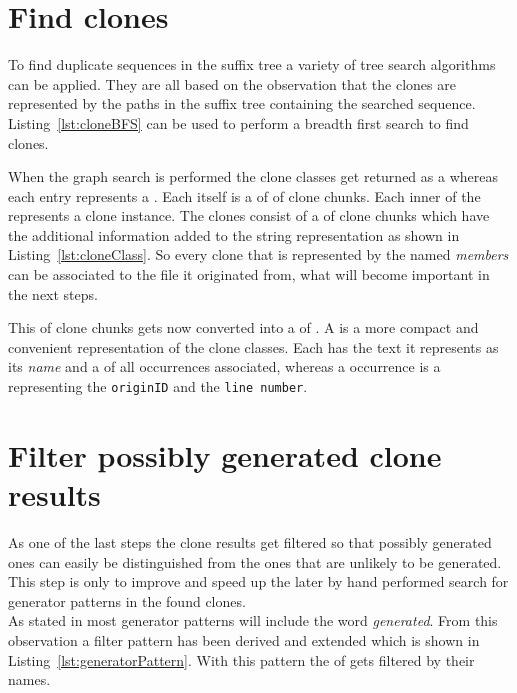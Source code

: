 \section{Find clones}
To find duplicate sequences in the suffix tree a variety of tree search algorithms can be applied. They are all based on the observation that the clones are represented by the paths in the suffix tree containing the searched sequence. Listing~\ref{lst:cloneBFS} can be used to perform a breadth first search to find clones.


When the graph search is performed the clone classes get returned as a  whereas each entry represents a . Each  itself is a  of  of clone chunks. Each inner  of the  represents a clone instance. The clones consist of a  of clone chunks which have the additional information added to the string representation as shown in Listing~\ref{lst:cloneClass}. So every clone that is represented by the  named \textit{members} can be associated to the file it originated from, what will become important in the next steps.


This  of clone chunks gets now converted into a  of . A  is a more compact and convenient representation of the clone classes. Each has the text it represents as its \textit{name} and a  of all occurrences associated, whereas a occurrence is a  representing the \texttt{originID} and the \texttt{line number}. 


\section{Filter possibly generated clone results}
As one of the last steps the clone results get filtered so that possibly generated ones can easily be distinguished from the ones that are unlikely to be generated. This step is only to improve and speed up the later by hand performed search for generator patterns in the found clones.\\
As stated in \cite{Bernwieser2014} most generator patterns will include the word \textit{generated}. From this observation a filter pattern has been derived and extended which is shown in Listing~\ref{lst:generatorPattern}. With this pattern the  of  gets filtered by their names.


